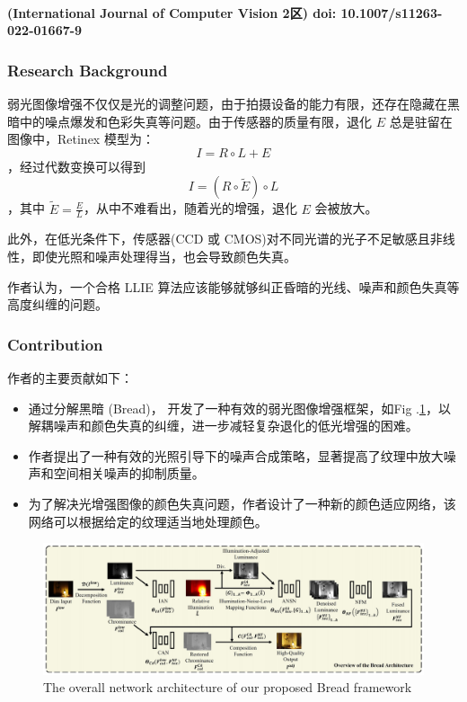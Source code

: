 \documentclass[letterpaper,10pt]{article}
\begin{document}
		\paragraph{(International Journal of Computer Vision 2区) doi: 10.1007/s11263-022-01667-9}
		
			\subsubsection{Research Background}
			
			弱光图像增强不仅仅是光的调整问题，由于拍摄设备的能力有限，还存在隐藏在黑暗中的噪点爆发和色彩失真等问题。由于传感器的质量有限，退化 $E$ 总是驻留在图像中，Retinex 模型为：$$I = R \circ L + E$$，经过代数变换可以得到 $$I = (R \circ \tilde{E}) \circ L$$，其中 $\tilde{E} = \frac{E}{L}$，从中不难看出，随着光的增强，退化 $E$ 会被放大。
			
			此外，在低光条件下，传感器(CCD 或 CMOS)对不同光谱的光子不足敏感且非线性，即使光照和噪声处理得当，也会导致颜色失真。
			
			作者认为，一个合格 LLIE 算法应该能够就够纠正昏暗的光线、噪声和颜色失真等高度纠缠的问题。
			
			\subsubsection{Contribution}
			
			作者的主要贡献如下：
			
			\begin{itemize}
				\item[(1)] 
				通过分解黑暗 (Bread)， 开发了一种有效的弱光图像增强框架，如Fig .\ref{fig: Bread}，以解耦噪声和颜色失真的纠缠，进一步减轻复杂退化的低光增强的困难。
				
				\item[(2)]
				作者提出了一种有效的光照引导下的噪声合成策略，显著提高了纹理中放大噪声和空间相关噪声的抑制质量。
				
				\item[(3)]
				为了解决光增强图像的颜色失真问题，作者设计了一种新的颜色适应网络，该网络可以根据给定的纹理适当地处理颜色。
			\end{itemize}	
			
			\begin{figure}[htbp]
				\centering 
				\includegraphics[width=\columnwidth]{picture/LLIE/Proposed Bread framework}
				\caption{
					\label{fig: Bread} 
					The overall network architecture of our proposed Bread framework
				}
			\end{figure}
			
\end{document}
